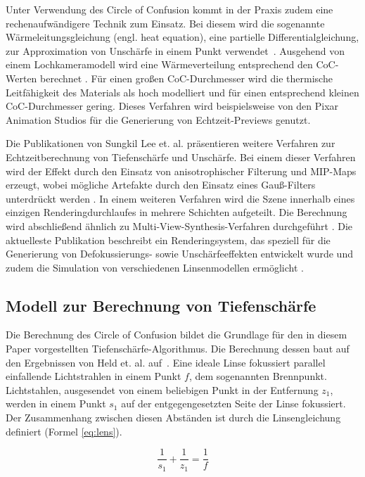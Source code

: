 \documentclass{acmsiggraph}                     %
\begin{document}
Unter Verwendung des Circle of Confusion kommt in der Praxis zudem eine rechenaufwändigere Technik zum Einsatz. Bei diesem wird die sogenannte Wärmeleitungsgleichung (engl. heat equation), eine partielle Differentialgleichung, zur Approximation von Unschärfe in einem Punkt verwendet~\cite{Bertalmio:2004lq,Kass:2006dq}. Ausgehend von einem Lochkameramodell wird eine Wärmeverteilung entsprechend den CoC-Werten berechnet \cite{Kass:2006dq}. Für einen großen CoC-Durchmesser wird die thermische Leitfähigkeit des Materials als hoch modelliert und für einen entsprechend kleinen CoC-Durchmesser gering. Dieses Verfahren wird beispielsweise von den Pixar Animation Studios für die Generierung von Echtzeit-Previews genutzt.

Die Publikationen von Sungkil Lee et. al. präsentieren weitere Verfahren zur Echtzeitberechnung von Tiefenschärfe und Unschärfe. Bei einem dieser Verfahren wird der Effekt durch den Einsatz von anisotrophischer Filterung und MIP-Maps erzeugt, wobei mögliche Artefakte durch den Einsatz eines Gauß-Filters unterdrückt werden \cite{Lee:2008nx}. In einem weiteren Verfahren wird die Szene innerhalb eines einzigen Renderingdurchlaufes in mehrere Schichten aufgeteilt. Die Berechnung wird abschließend ähnlich zu Multi-View-Synthesis-Verfahren durchgeführt \cite{Lee:2009eu}. Die aktuelleste Publikation beschreibt ein Renderingsystem, das speziell für die Generierung von Defokussierungs- sowie Unschärfeeffekten entwickelt wurde und zudem die Simulation von verschiedenen Linsenmodellen ermöglicht \cite{Lee:2010oq}.

\subsection{Modell zur Berechnung von Tiefenschärfe}

Die Berechnung des Circle of Confusion bildet die Grundlage für den in diesem Paper vorgestellten Tiefenschärfe-Algorithmus. Die Berechnung dessen baut auf den Ergebnissen von Held et. al. auf~\cite{Held:2010cr}. Eine ideale Linse fokussiert parallel einfallende Lichtstrahlen in einem Punkt $f$, dem sogenannten Brennpunkt. Lichtstahlen, ausgesendet von einem beliebigen Punkt in der Entfernung $z_1$, werden in einem Punkt  $s_1$ auf der entgegengesetzten Seite der Linse fokussiert. Der Zusammenhang zwischen diesen Abständen ist durch die Linsengleichung definiert (Formel \ref{eq:lens}).

\begin{equation}
 \frac{1}{s_1} + \frac{1}{z_1} = \frac{1}{f}
	\label{eq:lens}
\end{equation}
\end{document}
